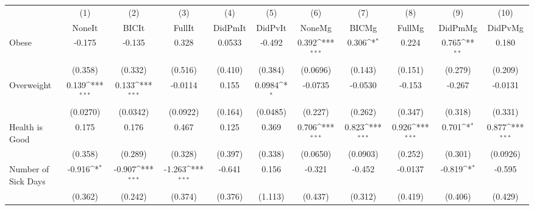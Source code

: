 {
\def\sym#1{\ifmmode^{#1}\else\(^{#1}\)\fi}
\begin{tabular}{l*{10}{c}}
\toprule
            &\multicolumn{1}{c}{(1)}&\multicolumn{1}{c}{(2)}&\multicolumn{1}{c}{(3)}&\multicolumn{1}{c}{(4)}&\multicolumn{1}{c}{(5)}&\multicolumn{1}{c}{(6)}&\multicolumn{1}{c}{(7)}&\multicolumn{1}{c}{(8)}&\multicolumn{1}{c}{(9)}&\multicolumn{1}{c}{(10)}\\
            &\multicolumn{1}{c}{NoneIt}&\multicolumn{1}{c}{BICIt}&\multicolumn{1}{c}{FullIt}&\multicolumn{1}{c}{DidPmIt}&\multicolumn{1}{c}{DidPvIt}&\multicolumn{1}{c}{NoneMg}&\multicolumn{1}{c}{BICMg}&\multicolumn{1}{c}{FullMg}&\multicolumn{1}{c}{DidPmMg}&\multicolumn{1}{c}{DidPvMg}\\
\midrule
Obese       &      -0.175         &      -0.135         &       0.328         &      0.0533         &      -0.492         &       0.392\sym{***}&       0.306\sym{*}  &       0.224         &       0.765\sym{**} &       0.180         \\
            &     (0.358)         &     (0.332)         &     (0.516)         &     (0.410)         &     (0.384)         &    (0.0696)         &     (0.143)         &     (0.151)         &     (0.279)         &     (0.209)         \\
\addlinespace
Overweight  &       0.139\sym{***}&       0.133\sym{***}&     -0.0114         &       0.155         &      0.0984\sym{*}  &     -0.0735         &     -0.0530         &      -0.153         &      -0.267         &     -0.0131         \\
            &    (0.0270)         &    (0.0342)         &    (0.0922)         &     (0.164)         &    (0.0485)         &     (0.227)         &     (0.262)         &     (0.347)         &     (0.318)         &     (0.331)         \\
\addlinespace
Health is Good&       0.175         &       0.176         &       0.467         &       0.125         &       0.369         &       0.706\sym{***}&       0.823\sym{***}&       0.926\sym{***}&       0.701\sym{*}  &       0.877\sym{***}\\
            &     (0.358)         &     (0.289)         &     (0.328)         &     (0.397)         &     (0.338)         &    (0.0650)         &    (0.0903)         &     (0.252)         &     (0.301)         &    (0.0926)         \\
\addlinespace
Number of Sick Days&      -0.916\sym{*}  &      -0.907\sym{***}&      -1.263\sym{***}&      -0.641         &       0.156         &      -0.321         &      -0.452         &     -0.0137         &      -0.819\sym{*}  &      -0.595         \\
            &     (0.362)         &     (0.242)         &     (0.374)         &     (0.376)         &     (1.113)         &     (0.437)         &     (0.312)         &     (0.419)         &     (0.406)         &     (0.429)         \\
\bottomrule
\end{tabular}
}
